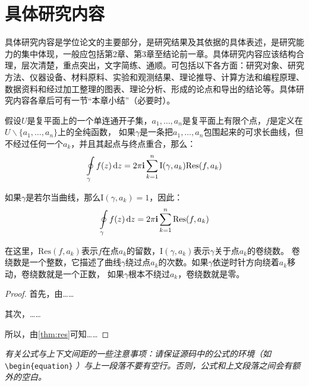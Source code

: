 %
%
%
%
%

\chapter{具体研究内容}

具体研究内容是学位论文的主要部分，是研究结果及其依据的具体表述，是研究能力的集中体现，一般应包括第2章、第3章至结论前一章。具体研究内容应该结构合理，层次清楚，重点突出，文字简练、通顺。可包括以下各方面：研究对象、研究方法、仪器设备、材料原料、实验和观测结果、理论推导、计算方法和编程原理、数据资料和经过加工整理的图表、理论分析、形成的论点和导出的结论等。具体研究内容各章后可有一节“本章小结”（必要时）。

\begin{them}[留数定理]
\label{thm:res}
  假设$U$是复平面上的一个单连通开子集，$a_1,\ldots,a_n$是复平面上有限个点，$f$是定义在$U\backslash \{a_1,\ldots,a_n\}$上的全纯函数，
  如果$\gamma$是一条把$a_1,\ldots,a_n$包围起来的可求长曲线，但不经过任何一个$a_k$，并且其起点与终点重合，那么：
  \begin{equation}
    \label{eq:res}
    \ointop_{\gamma}f(z)\,\mathrm{d}z = 2\pi\mathbf{i}\sum^n_{k=1}\mathrm{I}(\gamma,a_k)\mathrm{Res}(f,a_k)
  \end{equation}

  如果$\gamma$是若尔当曲线，那么$\mathrm{I}(\gamma, a_k)=1$，因此：
  \begin{equation}
    \label{eq:resthm}
    \ointop_{\gamma}f(z)\,\mathrm{d}z = 2\pi\mathbf{i}\sum^n_{k=1}\mathrm{Res}(f,a_k)
  \end{equation}

  在这里，$\mathrm{Res}(f, a_k)$表示$f$在点$a_k$的留数，$\mathrm{I}(\gamma,a_k)$表示$\gamma$关于点$a_k$的卷绕数。
  卷绕数是一个整数，它描述了曲线$\gamma$绕过点$a_k$的次数。如果$\gamma$依逆时针方向绕着$a_k$移动，卷绕数就是一个正数，
  如果$\gamma$根本不绕过$a_k$，卷绕数就是零。
\end{them}

\begin{proof}
  首先，由……

  其次，……

  所以，由\autoref{thm:res}可知……
  \qedhere
\end{proof}

\textit{有关公式与上下文间距的一些注意事项：请保证源码中的公式的环境（如}
\\ \verb|\begin{equation}|
  \textit{）与上一段落不要有空行。否则，公式和上文段落之间会有额外的空白。}
